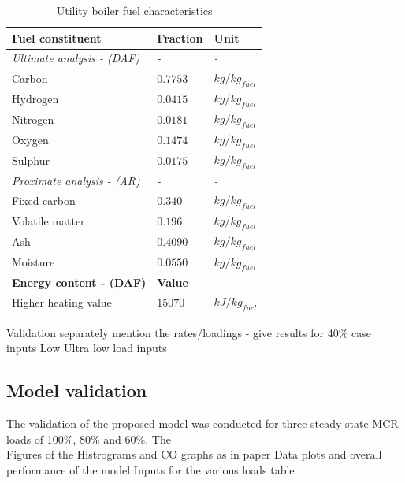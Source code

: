 \documentclass[review]{elsarticle}
\begin{document}
\begin{table}[h!]
\centering
\caption{Utility boiler fuel characteristics}
\vspace{5mm}
\label{fuel}
{\tabulinesep=1.2mm
\begin{tabularx}{\textwidth}{p{} p{} l}
\hline
\textbf{Fuel constituent} & \textbf{Fraction} & \textbf{Unit}\\
\hline
\textit{Ultimate analysis - (DAF)} & \textit{-} & \textit{-}\\
Carbon & $0.7753$ & $kg/kg_{fuel}$\\
Hydrogen & $0.0415$ & $kg/kg_{fuel}$\\
Nitrogen & $0.0181$ & $kg/kg_{fuel}$\\
Oxygen & $0.1474$ & $kg/kg_{fuel}$\\
Sulphur & $0.0175$ & $kg/kg_{fuel}$\\
\textit{Proximate analysis - (AR)} & \textit{-} & \textit{-}\\
Fixed carbon & $0.340$ & $kg/kg_{fuel}$\\
Volatile matter & $0.196$ & $kg/kg_{fuel}$\\
Ash & $0.4090$ & $kg/kg_{fuel}$\\
Moisture & $0.0550$ & $kg/kg_{fuel}$\\
\hline
\textbf{Energy content - (DAF)} & \textbf{Value} &\\
\hline
Higher heating value & $15070$ & $kJ/kg_{fuel}$\\
\hline
\end{tabularx}}
\end{table}



Validation separately mention the rates/loadings - give results for 40\% case inputs
Low Ultra low load inputs


\subsection{Model validation}
The validation of the proposed model was conducted for three steady state MCR loads of 100\%, 80\% and 60\%. The  
\\
Figures of the Histrograms and CO graphs as in paper
Data plots and overall performance of the model
Inputs for the various loads table
\end{document}
